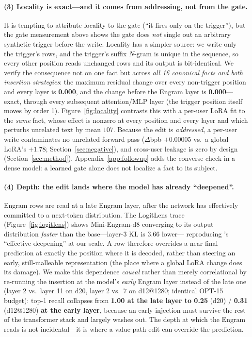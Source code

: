 \documentclass[11pt]{article}
\begin{document}
\paragraph{(3) Locality is exact---and it comes from addressing, not
from the gate.} It is tempting to attribute locality to the gate
(``it fires only on the trigger''), but the gate measurement above
shows the gate does \emph{not} single out an arbitrary synthetic
trigger before the write. Locality has a simpler source: we write
only the trigger's rows, and the trigger's suffix $N$-gram is unique
in the sequence, so every other position reads unchanged rows and its
output is bit-identical. We verify the consequence not on one fact but
across \emph{all 16 canonical facts and both insertion strategies}:
the maximum residual change over every
non-trigger position and every layer is \textbf{0.000}, and the change
before the Engram layer is \textbf{0.000}---exact, through every
subsequent attention/MLP layer (the trigger position itself moves by
order 1). Figure~\ref{fig:locality} contrasts this with a per-user
LoRA fit to the \emph{same} fact, whose effect is nonzero at every
position and every layer and which perturbs unrelated text by mean
$107$. Because the edit is \emph{addressed}, a per-user write
contaminates no unrelated forward pass ($\Delta$bpb $+0.00005$ vs.\ a
global LoRA's $+1.78$; Section~\ref{sec:negative}), and cross-user
leakage is zero by design (Section~\ref{sec:method}). Appendix~\ref{app:followup} adds the converse
check in a dense model: a learned gate alone does not localize a fact
to its subject.

\paragraph{(4) Depth: the edit lands where the model has already
``deepened''.} Engram rows are read at a late Engram layer, after
the network has effectively committed to a next-token
distribution. The LogitLens trace (Figure~\ref{fig:logitlens})
shows Mini-Engram-d8 converging to its output distribution
\emph{faster} than the base---layer-3 KL is 3.66 lower---%
reproducing \citeauthor{cheng2026engram}'s ``effective deepening'' at our scale.
A row therefore overrides a near-final prediction at exactly the
position where it is decoded, rather than steering an early,
still-malleable representation (the place where a global LoRA
change does its damage). We make this dependence \emph{causal}
rather than merely correlational by re-running the insertion at the
model's \emph{early} Engram layer instead of the late one (layer 2
vs.\ layer 11 on d20, layer 2 vs.\ 7 on d12@1280; identical OPT-15
budget): top-1 recall collapses from
\textbf{1.00 at the late layer to 0.25} (d20) / \textbf{0.31}
(d12@1280) \textbf{at the early layer}, because an early injection
must survive the rest of the transformer stack and largely washes
out. The depth at which the Engram reads is not incidental---it is
where a value-path edit can override the prediction.
\end{document}
